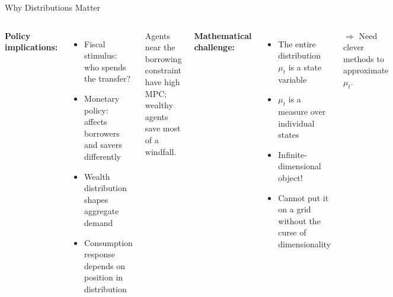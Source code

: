 \documentclass[aspectratio=169,11pt]{beamer}
\newcommand{\emphc}[1]{\textcolor{harvardcrimson}{#1}}
\begin{document}
\begin{frame}{Why Distributions Matter}
\begin{columns}[T]
\textbf{Policy implications:}
\begin{itemize}
    \item Fiscal stimulus: who spends the transfer?
    \item Monetary policy: affects borrowers and savers differently
    \item Wealth distribution shapes \emphc{aggregate demand}
    \item Consumption response depends on \emphc{position in distribution}
\end{itemize}

\vspace{0.3em}
{\small Agents near the borrowing constraint have high MPC; wealthy agents save most of a windfall.}

\textbf{Mathematical challenge:}
\begin{itemize}
    \item The \emphc{entire distribution} $\mu_t$ is a state variable
    \item $\mu_t$ is a \emphc{measure} over individual states
    \item Infinite-dimensional object!
    \item Cannot put it on a grid without the curse of dimensionality
\end{itemize}

\vspace{0.3em}
$\Rightarrow$ Need clever methods to approximate $\mu_t$.
\end{columns}
\end{frame}
\end{document}
